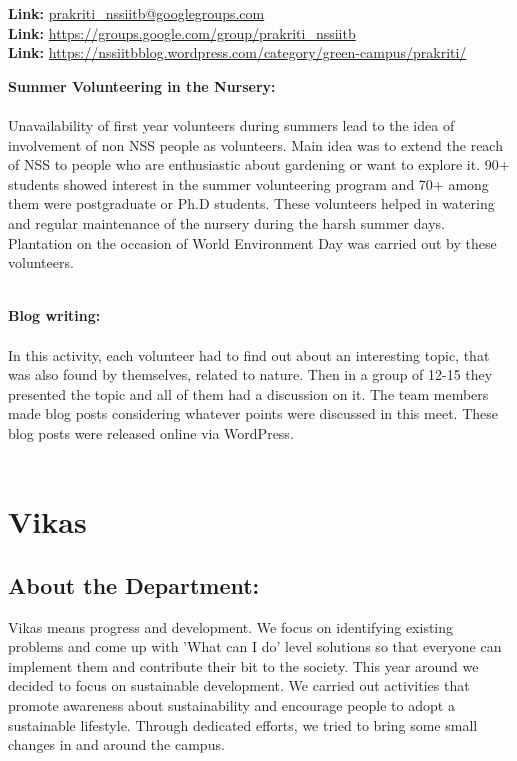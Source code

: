 \noindent \textbf{\linebreak Link: } \url{prakriti_nssiitb@googlegroups.com} \\
\noindent \textbf{Link: } \url{https://groups.google.com/group/prakriti_nssiitb}\\
\noindent \textbf{Link: } \url{https://nssiitbblog.wordpress.com/category/green-campus/prakriti/
} \\

\noindent \textbf{\Large \linebreak Summer Volunteering in the Nursery:}\\ \\ Unavailability of first year volunteers during summers lead to the idea of involvement of non NSS people as volunteers. Main idea was to extend the reach of NSS to people who are enthusiastic about gardening or want to explore it. 90+ students showed interest in the summer volunteering program and 70+ among them were postgraduate or Ph.D students.
These volunteers helped in watering and regular maintenance of the nursery during the harsh summer days. Plantation on the occasion of World Environment Day was carried out by these volunteers. \\ \\

\noindent \textbf{\Large Blog writing:}\\ \\ In this activity, each volunteer had to find out about an interesting topic, that was also found by themselves, related to nature. Then in a group of 12-15 they presented the topic and all of them  had a discussion on it. The team members made blog posts considering whatever points were discussed in this meet. These blog posts were released online via WordPress. \\ \\

\pagebreak
\chapter*{Vikas}
\section*{\LARGE About the Department:}Vikas means progress and development. We focus on identifying existing problems and come up with 'What can I do' level solutions so that everyone can implement them and contribute their bit to the society. This year around we decided to focus on sustainable development. We carried out activities that promote awareness about sustainability and encourage people to adopt a sustainable lifestyle. Through dedicated efforts, we tried to bring some small changes in and around the campus.


